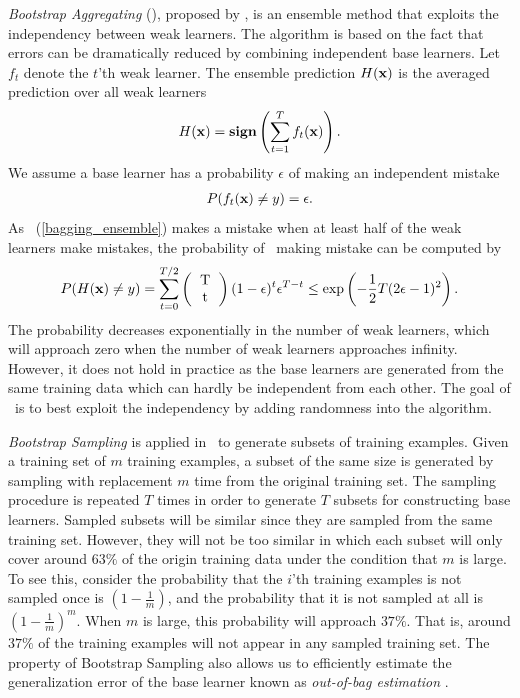 {\textit{Bootstrap Aggregating} (\bagging), proposed by \citet{Breiman96bagging}, is an ensemble method that exploits the independency between weak learners.
The algorithm is based on the fact that errors can be dramatically reduced by combining independent base learners.
Let $f_t$ denote the $t$'th weak learner.
The ensemble prediction $H(\mathbf {x})$ is the averaged prediction over all weak learners
\begin{align}
	H(\mathbf {x}) = \textbf{sign}\left(\sum_{t=1}^{T}f_t(\mathbf {x})\right). \label{bagging_ensemble}
\end{align}
We assume a base learner has a probability $\epsilon$ of making an independent mistake
\begin{align*}
	P(f_t(\mathbf {x}) \ne y) = \epsilon.
\end{align*}
As \bagging\ (\ref{bagging_ensemble}) makes a mistake when at least half of the weak learners make mistakes, the probability of \bagging\ making mistake can be computed by
\begin{align*}
	P(H(\vx)\neq y) = \sum_{t=0}^{T/2}\left(\begin{tabular}{cc}T\\t\end{tabular}\right)(1-\epsilon)^t\epsilon^{T-t} \le\exp\left(-\frac{1}{2}T(2\epsilon-1)^2\right).
\end{align*}
The probability decreases exponentially in the number of weak learners, which will approach zero when the number of weak learners approaches infinity.
However, it does not hold in practice as the base learners are generated from the same training data which can hardly be independent from each other.
The goal of \bagging\ is to best exploit the independency by adding randomness into the algorithm.

\textit{Bootstrap Sampling} \citep{Efron1994introduction} is applied in \bagging\ to generate subsets of training examples.
Given a training set of $m$ training examples, a subset of the same size is generated by sampling with replacement $m$ time from the original training set.
The sampling procedure is repeated $T$ times in order to generate $T$ subsets for constructing base learners.
Sampled subsets will be similar since they are sampled from the same training set.
However, they will not be too similar in which each subset will only cover around $63\%$ of the origin training data under the condition that $m$ is large.
To see this, consider the probability that the $i$'th training examples is not sampled once is $(1-\frac{1}{m})$, and the probability that it is not sampled at all is $(1-\frac{1}{m})^m$.
When $m$ is large, this probability will approach $37\%$. 
That is, around $37\%$ of the training examples will not appear in any sampled training set.
The property of Bootstrap Sampling also allows us to efficiently estimate the generalization error of the base learner known as \textit{out-of-bag estimation} \citep{Breiman96out,Tibshirani1996bias,Wolpert99an}.

}
